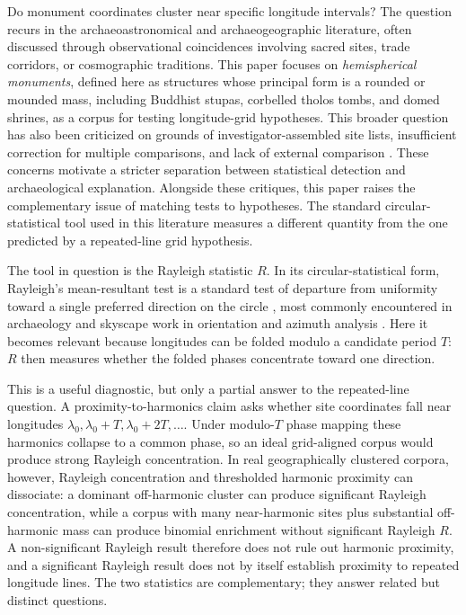 \documentclass[12pt,a4paper]{article}
\begin{document}
Do monument coordinates cluster near specific longitude intervals? The question
recurs in the archaeoastronomical and archaeogeographic literature,
often discussed through observational coincidences involving sacred sites,
trade corridors, or cosmographic traditions. This paper focuses on
\emph{hemispherical monuments}, defined here as structures whose principal form is a
rounded or mounded mass, including Buddhist stupas, corbelled tholos
tombs, and domed shrines, as a corpus for testing
longitude-grid hypotheses. This broader question has also been
criticized on grounds of investigator-assembled site lists,
insufficient correction for multiple comparisons, and lack of
external comparison
\citep{williamson1983leylines,freeman1976,kendall1974}. These
concerns motivate a stricter separation between statistical detection
and archaeological explanation. Alongside these critiques, this paper raises the
complementary issue of matching tests to hypotheses. The standard
circular-statistical tool used in this literature measures a
different quantity from the one predicted by a repeated-line grid
hypothesis.

The tool in question is the Rayleigh statistic $R$. In its
circular-statistical form, Rayleigh's mean-resultant test is a standard
test of departure from uniformity toward a single preferred direction
on the circle \citep{rayleigh1919,fisher1993circular,mardiajupp2000},
most commonly encountered in archaeology and skyscape work in orientation
and azimuth analysis \citep{magli2016,silva2020statistical}. Here it
becomes relevant because longitudes can be folded modulo a candidate
period $T$: $R$ then measures whether the folded phases concentrate
toward one direction.

This is a useful diagnostic, but only a partial answer to the
repeated-line question. A proximity-to-harmonics claim asks whether
site coordinates fall near longitudes $\lambda_0, \lambda_0 + T, \lambda_0 + 2T,
\ldots$. Under modulo-$T$ phase mapping these harmonics collapse to a
common phase, so an ideal grid-aligned corpus would produce strong
Rayleigh concentration. In real geographically clustered corpora,
however, Rayleigh concentration and thresholded harmonic proximity can
dissociate: a dominant off-harmonic cluster can produce significant
Rayleigh concentration, while a corpus with many near-harmonic sites
plus substantial off-harmonic mass can produce binomial enrichment
without significant Rayleigh $R$. A non-significant Rayleigh result
therefore does not rule out harmonic proximity, and a significant
Rayleigh result does not by itself establish proximity to repeated
longitude lines. The two statistics are complementary; they answer
related but distinct questions.
\end{document}
